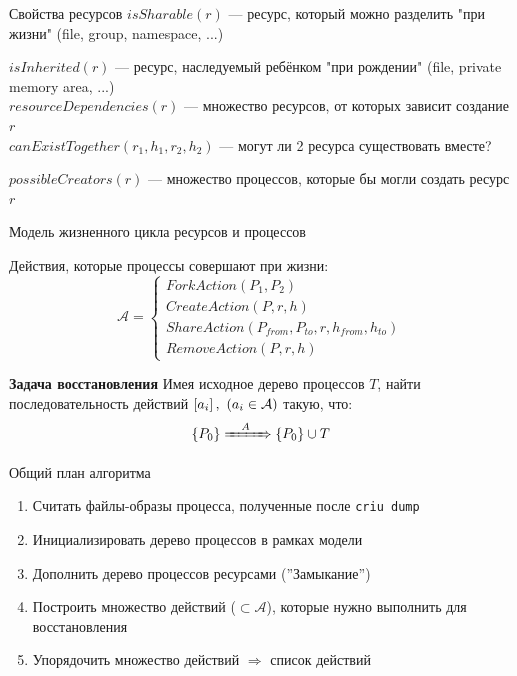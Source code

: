 \begin{frame}{Свойства ресурсов}
\alert{$isSharable(r)$} --- ресурс, который можно разделить "при жизни" (file, group, namespace, ...)

\alert{$isInherited(r)$} --- ресурс, наследуемый ребёнком "при рождении" (file, private memory area, ...)\\

\alert{$resourceDependencies(r)$} --- множество ресурсов, от которых зависит создание $r$\\


\alert{$canExistTogether(r_1, h_1, r_2, h_2)$} --- могут ли 2 ресурса существовать вместе?

\alert{$possibleCreators(r)$} --- множество процессов, которые бы могли создать ресурс $r$
\end{frame}

\begin{frame}{Модель жизненного цикла ресурсов и процессов}

Действия, которые процессы совершают при жизни:
\begin{equation*}
\mathcal{A} = 
\begin{cases}
ForkAction(P_1, P_2)\\
CreateAction(P, r, h)\\
ShareAction(P_{from}, P_{to}, r, h_{from}, h_{to})\\
RemoveAction(P, r, h)
\end{cases}
\end{equation*}


\begin{block}{\textbf{Задача восстановления}}
Имея исходное дерево процессов $T$, найти последовательность действий $\left[ a_i \right],\ (a_i \in \mathcal{A})$ такую, что:
\begin{equation*}
\left\lbrace P_0 \right\rbrace \xRightarrow{\hspace{1em}A\hspace{1em}} \left\lbrace P_0 \right\rbrace \cup T
\end{equation*}
\end{block}
\end{frame}

\begin{frame}{Общий план алгоритма}
\begin{enumerate}
	\item Считать файлы-образы процесса, полученные после \texttt{criu dump}
	\item Инициализировать дерево процессов в рамках модели
	\item Дополнить дерево процессов ресурсами (''Замыкание'')
	\item Построить множество действий ($\subset \mathcal{A}$), которые нужно выполнить для восстановления
	\item Упорядочить множество действий $\Rightarrow$ список действий
\end{enumerate}
\end{frame}

